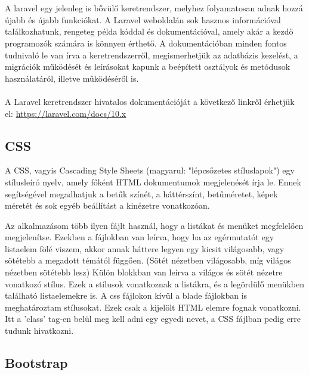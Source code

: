 \documentclass[
]{thesis-ekf}
\theoremstyle{definition}
\theoremstyle{remark}
\begin{document}

\vspace{5mm}
\noindent
\\\\
A laravel egy jelenleg is bővülő keretrendszer, melyhez folyamatosan adnak hozzá újabb és újabb funkciókat. A Laravel weboldalán sok hasznos információval találkozhatunk, rengeteg példa kóddal és dokumentációval, amely akár a kezdő programozók számára is könnyen érthető. A dokumentációban minden fontos tudnivaló le van írva a keretrendszerről, megismerhetjük az adatbázis kezelést, a migrációk működését és leírásokat kapunk a beépített osztályok és metódusok használatáról, illetve működéséről is.
\\\\
A Laravel keretrendszer hivatalos dokumentációját a következő linkről érhetjük el:
\url{https://laravel.com/docs/10.x}

\subsection{CSS}

A CSS, vagyis Cascading Style Sheets (magyarul: "lépcsőzetes stíluslapok") egy stílusleíró nyelv, amely főként HTML dokumentumok megjelenését írja le. Ennek segítségével megadhatjuk a betűk színét, a háttérszínt, betűméretet, képek méretét és sok egyéb beállítást a kinézetre vonatkozóan.


\vspace{5mm}

Az alkalmazásom több ilyen fájlt használ, hogy a listákat és menüket megfelelően megjelenítse. Ezekben a fájlokban van leírva, hogy ha az egérmutatót egy listaelem fölé viszem, akkor annak háttere legyen egy kicsit világosabb, vagy sötétebb a megadott témától függően. (Sötét nézetben világosabb, míg világos nézetben sötétebb lesz)
Külön blokkban van leírva a világos és sötét nézetre vonatkozó stílus. Ezek a stílusok vonatkoznak a listákra, és a legördülő menükben található listaelemekre is.
A css fájlokon kívül a blade fájlokban is meghatároztam stílusokat. Ezek csak a kijelölt HTML elemre fognak vonatkozni. Itt a 'class' tag-en belül meg kell adni egy egyedi nevet, a CSS fájlban pedig erre tudunk hivatkozni.

\subsection{Bootstrap}
\end{document}
